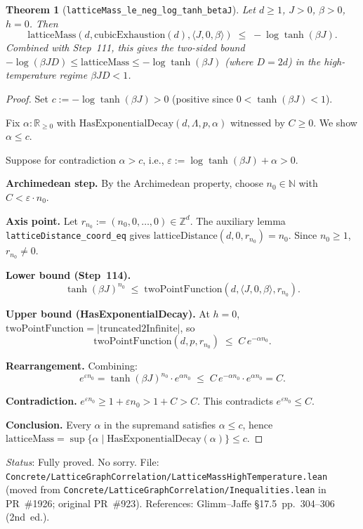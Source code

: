 \documentclass[a4paper,11pt]{article}
\newtheorem{theorem}{Theorem}
\begin{document}
\begin{theorem}[\texttt{latticeMass\_le\_neg\_log\_tanh\_betaJ}]
Let $d \ge 1$, $J > 0$, $\beta > 0$, $h = 0$.  Then
\[
  \mathrm{latticeMass}(d,\mathrm{cubicExhaustion}(d),\langle J,0,\beta\rangle)
  \;\le\; -\log\tanh(\beta J).
\]
Combined with Step~111, this gives the two-sided bound
$-\log(\beta J D) \le \mathrm{latticeMass} \le -\log\tanh(\beta J)$
(where $D = 2d$) in the high-temperature regime $\beta J D < 1$.
\end{theorem}

\begin{proof}
Set $c := -\log\tanh(\beta J) > 0$ (positive since $0 < \tanh(\beta J) < 1$).

Fix $\alpha : \mathbb{R}_{\ge 0}$ with $\mathrm{HasExponentialDecay}(d,\Lambda,p,\alpha)$ witnessed by $C \ge 0$.
We show $\alpha \le c$.

Suppose for contradiction $\alpha > c$, i.e., $\varepsilon := \log\tanh(\beta J) + \alpha > 0$.

\textbf{Archimedean step.}
By the Archimedean property, choose $n_0 \in \mathbb{N}$ with $C < \varepsilon \cdot n_0$.

\textbf{Axis point.}
Let $r_{n_0} := (n_0, 0, \ldots, 0) \in \mathbb{Z}^d$.
The auxiliary lemma \texttt{latticeDistance\_coord\_eq} gives
$\mathrm{latticeDistance}(d,0,r_{n_0}) = n_0$.
Since $n_0 \ge 1$, $r_{n_0} \neq 0$.

\textbf{Lower bound (Step~114).}
\[
  \tanh(\beta J)^{n_0} \;\le\; \mathrm{twoPointFunction}(d,\langle J,0,\beta\rangle,r_{n_0}).
\]

\textbf{Upper bound (HasExponentialDecay).}
At $h = 0$, $\mathrm{twoPointFunction} = |\mathrm{truncated2Infinite}|$, so
\[
  \mathrm{twoPointFunction}(d,p,r_{n_0}) \;\le\; C\,e^{-\alpha n_0}.
\]

\textbf{Rearrangement.}
Combining:
\[
  e^{\varepsilon n_0}
  = \tanh(\beta J)^{n_0} \cdot e^{\alpha n_0}
  \;\le\; C\,e^{-\alpha n_0} \cdot e^{\alpha n_0} = C.
\]

\textbf{Contradiction.}
$e^{\varepsilon n_0} \ge 1 + \varepsilon n_0 > 1 + C > C$.
This contradicts $e^{\varepsilon n_0} \le C$.

\textbf{Conclusion.}
Every $\alpha$ in the supremand satisfies $\alpha \le c$, hence
$\mathrm{latticeMass} = \sup\{\alpha \mid \mathrm{HasExponentialDecay}(\alpha)\} \le c$.
\end{proof}

\noindent\textit{Status}: Fully proved. No sorry.
File: \texttt{Concrete/LatticeGraphCorrelation/LatticeMassHighTemperature.lean} (moved from \texttt{Concrete/LatticeGraphCorrelation/Inequalities.lean} in PR~\#1926; original PR~\#923).
References: Glimm--Jaffe \S17.5~pp.~304--306 (2nd~ed.).
\end{document}
